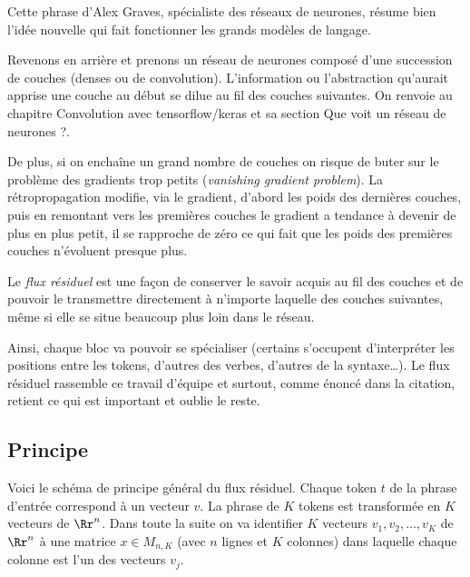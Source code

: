 \documentclass[11pt,class=report,crop=false]{standalone}
\begin{document}

Cette phrase d'Alex Graves, spécialiste des réseaux de neurones,
résume bien l'idée nouvelle qui fait fonctionner les grands modèles de langage.

Revenons en arrière et prenons un réseau de neurones composé d'une succession de couches (denses ou de convolution). L'information ou l'abstraction qu'aurait apprise une couche au début se dilue au fil des couches suivantes. On renvoie au chapitre 
\og{}Convolution avec tensorflow/keras\fg{} et sa section \og{}Que voit un réseau de neurones ?\fg{}.

De plus, si on enchaîne un grand nombre de couches on risque de buter sur le problème des gradients trop petits (\emph{vanishing gradient problem}). La rétropropagation modifie, via le gradient, d'abord les poids des dernières couches, puis en remontant vers les premières couches le gradient a tendance à devenir de plus en plus petit, il se rapproche de zéro ce qui fait que les poids des premières couches n’évoluent presque plus.

Le \emph{flux résiduel} est une façon de conserver le savoir acquis au fil des couches et de pouvoir le transmettre directement à n’importe laquelle des couches suivantes, même si elle se situe beaucoup plus loin dans le réseau.

Ainsi, chaque bloc va pouvoir se spécialiser (certains s’occupent d’interpréter les positions entre les tokens, d’autres des verbes, d’autres de la syntaxe\ldots).
Le flux résiduel rassemble ce travail d’équipe et surtout, comme énoncé dans la citation, retient ce qui est important et oublie le reste.



\subsection{Principe}

Voici le schéma de principe général du flux résiduel. Chaque token $t$ de la phrase d'entrée correspond à un vecteur $v$.
La phrase de $K$ tokens est transformée en $K$ vecteurs de $\Rr^n$.
Dans toute la suite on va identifier $K$ vecteurs $v_1,v_2,\ldots,v_K$ de $\Rr^n$ à une matrice $x \in M_{n,K}$ (avec $n$ lignes et $K$ colonnes) dans laquelle chaque colonne est l'un des vecteurs $v_j$.


\end{document}
